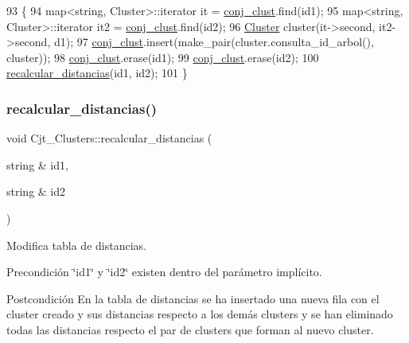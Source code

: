 \begin{DoxyCode}
93 \{
94     map<string, Cluster>::iterator it = \hyperlink{class_cjt___clusters_a1202e93aafa953b2dc9a76d03f056b08}{conj\_clust}.find(id1);
95     map<string, Cluster>::iterator it2 = \hyperlink{class_cjt___clusters_a1202e93aafa953b2dc9a76d03f056b08}{conj\_clust}.find(id2);
96     \hyperlink{class_cluster}{Cluster} cluster(it->second, it2->second, d1);
97     \hyperlink{class_cjt___clusters_a1202e93aafa953b2dc9a76d03f056b08}{conj\_clust}.insert(make\_pair(cluster.consulta\_id\_arbol(), cluster));
98     \hyperlink{class_cjt___clusters_a1202e93aafa953b2dc9a76d03f056b08}{conj\_clust}.erase(id1);
99     \hyperlink{class_cjt___clusters_a1202e93aafa953b2dc9a76d03f056b08}{conj\_clust}.erase(id2);
100     \hyperlink{class_cjt___clusters_a863e81011d5f5145a57e2e55470e89d4}{recalcular\_distancias}(id1, id2); 
101 \}
\end{DoxyCode}
\mbox{\label{class_cjt___clusters_a863e81011d5f5145a57e2e55470e89d4}} 
\subsubsection{\texorpdfstring{recalcular\+\_\+distancias()}{recalcular\_distancias()}}
{\footnotesize\ttfamily void Cjt\+\_\+\+Clusters\+::recalcular\+\_\+distancias (\begin{DoxyParamCaption}\item[{string \&}]{id1,  }\item[{string \&}]{id2 }\end{DoxyParamCaption})}



Modifica tabla de distancias. 

\begin{DoxyPrecond}{Precondición}
\char`\"{}id1\char`\"{} y \char`\"{}id2\char`\"{} existen dentro del parámetro implícito. 
\end{DoxyPrecond}
\begin{DoxyPostcond}{Postcondición}
En la tabla de distancias se ha insertado una nueva fila con el cluster creado y sus distancias respecto a los demás clusters y se han eliminado todas las distancias respecto el par de clusters que forman al nuevo cluster. 
\end{DoxyPostcond}


